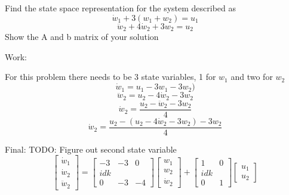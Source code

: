 
\item Find the state space representation for the system described as
  \begin{equation}
    \dot w_1 + 3(w_1 + w_2) = u_1
  \end{equation}
  \begin{equation}
    \ddot w_2 + 4\dot w_2 + 3w_2 = u_2
  \end{equation}
  Show the A and b matrix of your solution

  Work:

  For this problem there needs to be 3 state variables, 1 for $w_1$ and two for $w_2$
  \begin{equation}
    \dot w_1 = u_1 - 3w_1 - 3w_2)
  \end{equation}
  \begin{equation}
    \ddot w_2 = u_2 - 4\dot w_2 - 3w_2 
  \end{equation}
  \begin{equation}
    \dot w_2 = \frac{u_2 - \ddot w_2 - 3w_2} 4
  \end{equation}
  \begin{equation}
    \dot w_2 = \frac{u_2 - (u_2 - 4\dot w_2 - 3w_2) - 3w_2} 4
  \end{equation}

  Final:
  {\LARGE \color{red} TODO: Figure out second state variable}
  \begin{equation}
    \begin{bmatrix}
      \dot w_1 \\
      \dot w_2 \\
      \ddot w_2
    \end{bmatrix} =
    \begin{bmatrix}
      -3 & -3 & 0\\
      idk\\
       0 & -3 & -4
    \end{bmatrix}
    \begin{bmatrix}
      w_1 \\
      w_2 \\
      \dot w_2
    \end{bmatrix} +
    \begin{bmatrix}
      1 & 0 \\
      idk\\
      0 & 1
    \end{bmatrix}
    \begin{bmatrix}
      u_1 \\
      u_2
    \end{bmatrix}
  \end{equation}
